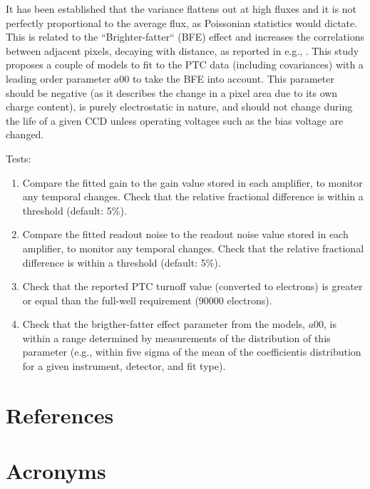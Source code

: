 \documentclass[DM,authoryear,toc,lsstdraft]{lsstdoc}
\begin{document}
It has been established that the variance flattens out at high fluxes and it is not perfectly proportional to the average flux, as Poissonian statistics would dictate. This is related to the ``Brighter-fatter`` (BFE) effect and increases the correlations between adjacent pixels, decaying with distance, as reported in e.g., \citet{2019A&A...629A..36A}. This study proposes a couple of models to fit to the PTC data (including covariances) with a leading order parameter $a00$ to take the BFE into account. This parameter should be negative (as it describes the change in a pixel area due to its own charge content), is purely electrostatic in nature, and should not change during the life of a given CCD unless operating voltages such as the bias voltage are changed.

Tests:
\begin{enumerate}
\item Compare the fitted gain to the gain value stored in each amplifier, to monitor any temporal changes. Check that the relative fractional difference is within a threshold (default: 5\%).
\item Compare the fitted readout noise to the readout noise value stored in each amplifier, to monitor any temporal changes. Check that the relative fractional difference is within a threshold (default: 5\%).
\item Check that the reported PTC turnoff value (converted to electrons) is greater or equal than the full-well requirement (90000 electrons).
\item Check that the brigther-fatter effect parameter from the \citet{2019A&A...629A..36A} models, $a00$, is within a range determined by measurements of the distribution of this parameter (e.g., within five sigma of the mean of the coefficientis distribution for a given instrument, detector, and fit type).
\end{enumerate}

\appendix

\section{References} \label{sec:bib}
\renewcommand{\refname}{} %


\section{Acronyms} \label{sec:acronyms}

\end{document}
